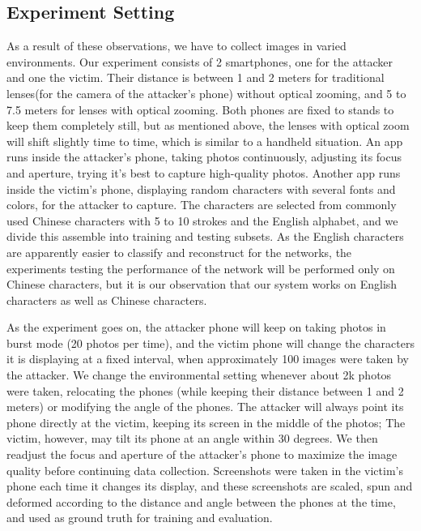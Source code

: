 \subsection{Experiment Setting}
As a result of these observations, we have to collect images in varied environments. Our experiment consists of 2 smartphones, one for the attacker and one the victim. Their distance is between 1 and 2 meters for traditional lenses(for the camera of the attacker's phone) without optical zooming, and 5 to 7.5 meters for lenses with optical zooming. Both phones are fixed to stands to keep them completely still, but as mentioned above, the lenses with optical zoom will shift slightly time to time, which is similar to a handheld situation. An app runs inside the attacker's phone, taking photos continuously, adjusting its focus and aperture, trying it's best to capture high-quality photos. Another app runs inside the victim's phone, displaying random characters with several fonts and colors, for the attacker to capture. The characters are selected from commonly used Chinese characters with 5 to 10 strokes and the English alphabet, and we divide this assemble into training and testing subsets. As the English characters are apparently easier to classify and reconstruct for the networks, the experiments testing the performance of the network will be performed only on Chinese characters, but it is our observation that our system works on English characters as well as Chinese characters.

As the experiment goes on, the attacker phone will keep on taking photos in burst mode (20 photos per time), and the victim phone will change the characters it is displaying at a fixed interval, when approximately 100 images were taken by the attacker. We change the environmental setting whenever about 2k photos were taken, relocating the phones (while keeping their distance between 1 and 2 meters) or modifying the angle of the phones. The attacker will always point its phone directly at the victim, keeping its screen in the middle of the photos; The victim, however, may tilt its phone at an angle within 30 degrees. We then readjust the focus and aperture of the attacker's phone to maximize the image quality before continuing data collection. Screenshots were taken in the victim's phone each time it changes its display, and these screenshots are scaled, spun and deformed according to the distance and angle between the phones at the time, and used as ground truth for training and evaluation.

